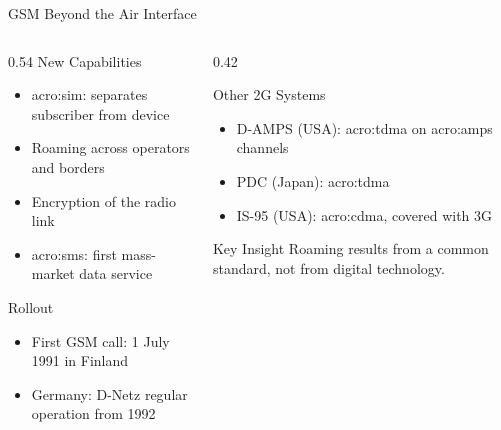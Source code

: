 \begin{frame}{GSM Beyond the Air Interface}
  \begin{columns}[T,onlytextwidth]
    \begin{column}{0.54\textwidth}
      New Capabilities
      \begin{itemize}
        \item \Gls{acro:sim}: separates subscriber from device
        \item Roaming across operators and borders
        \item Encryption of the radio link
        \item \Gls{acro:sms}: first mass-market data service
      \end{itemize}
      \vspace{0.4em}
      Rollout
      \begin{itemize}
        \item First GSM call: 1 July 1991 in Finland~\cite{hillebrand-gsm}
        \item Germany: D-Netz regular operation from 1992~\cite{hillebrand-gsm}
      \end{itemize}
    \end{column}
    \begin{column}{0.42\textwidth}
      \begin{block}{Other 2G Systems}
        \begin{itemize}
          \item D-AMPS (USA): \gls{acro:tdma} on \gls{acro:amps} channels
          \item PDC (Japan): \gls{acro:tdma}
          \item IS-95 (USA): \gls{acro:cdma}, covered with 3G
        \end{itemize}
      \end{block}
      \begin{alertblock}{Key Insight}
        Roaming results from a common standard, not from digital technology.
      \end{alertblock}
    \end{column}
  \end{columns}
\end{frame}



